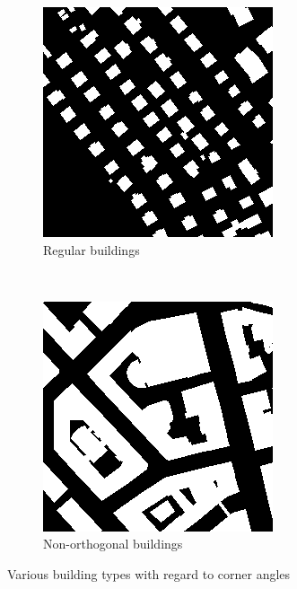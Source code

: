 \begin{figure}[H]
    \centering
	\begin{subfigure}{0.4\textwidth}
    	\includegraphics[width=0.9\linewidth]{chapters/challenges/images/regular_building_masks.png}		    \caption{Regular buildings}
    	\label{fig:challenges:regular_buildings}
	\end{subfigure}~
	\begin{subfigure}{0.4\textwidth}
    	\includegraphics[width=0.9\linewidth]{chapters/challenges/images/irregular_building_masks.png}       	\caption{Non-orthogonal buildings}
    	\label{fig:challenges:irregular_buildings}
	\end{subfigure}
	\caption{Various building types with regard to corner angles}
	\label{fig:challenges:building_ground_truths}
\end{figure}

